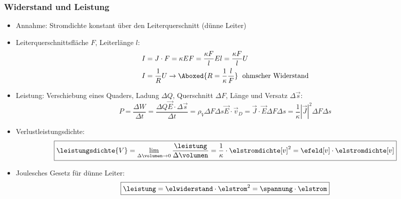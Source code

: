 \begin{frame}
  \frametitle{Widerstand und Leistung}
\begin{itemize}[<+->]      
\item Annahme: Stromdichte konstant über den Leiterquerschnitt (dünne Leiter)
\item Leiterquerschnittsfläche $F$, Leiterlänge $l$:
  \begin{align*}
    I&=J\cdot F =\kappa E F = \frac{\kappa F}{l} El = \frac{\kappa F}{l} U\\
    I&= \frac{1}{R} U \to \Aboxed{R = \frac{1}{\kappa} \frac{l}{F}}\;\text{ ohmscher Widerstand}
  \end{align*}
\item Leistung: Verschiebung eines Quaders, Ladung $\Delta Q$, Querschnitt $\Delta F$, Länge und Versatz $\Delta\vec{s}$:
  $$
  P = \frac{\Delta W}{\Delta t} = \frac{\Delta Q \vec{E}\cdot \Delta\vec{s}}{\Delta t}
  = \rho_V\Delta F\Delta s \vec{E}\cdot\vec{v}_D = \vec{J}\cdot \vec{E} \Delta F\Delta s = \frac{1}{\kappa}|\vec{J}|^2\Delta F\Delta s$$
\item Verlustleistungsdichte:
\begin{equation*}
	\boxed{\leistungsdichte{V} = \lim\limits_{\Delta \volumen \rightarrow 0} \dfrac{\leistung}{\Delta \volumen} = \dfrac{1}{\kappa} \cdot \elstromdichte[v]^2 = \efeld[v] \cdot \elstromdichte[v]}
\end{equation*}
\item \alert{Joulesches Gesetz} für dünne Leiter:
  \begin{equation*}
	\boxed{\leistung = \elwiderstand \cdot \elstrom^2 = \spannung \cdot \elstrom}
\end{equation*}

  \end{itemize}
\end{frame}

